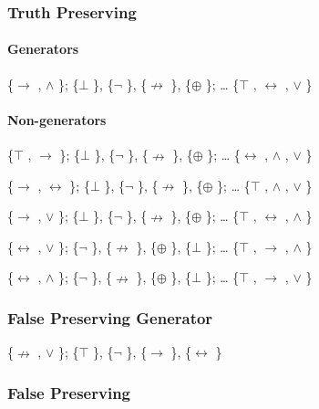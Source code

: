\hypertarget{truth-preserving}{%
\subsubsection{Truth Preserving}\label{truth-preserving}}

\hypertarget{generators}{%
\paragraph{Generators}\label{generators}}

\{$\to$ , $\land$ \}; \{$\bot$ \}, \{$\neg$ \}, \{$\nrightarrow$ \}, \{$\oplus$ \}; \ldots{} \{$\top$ , $\leftrightarrow$ , $\lor$ \}

\hypertarget{non-generators}{%
\paragraph{Non-generators}\label{non-generators}}

\{$\top$ , $\to$ \}; \{$\bot$ \}, \{$\neg$ \}, \{$\nrightarrow$ \}, \{$\oplus$ \}; \ldots{} \{$\leftrightarrow$ , $\land$ , $\lor$ \}

\{$\to$ , $\leftrightarrow$ \}; \{$\bot$ \}, \{$\neg$ \}, \{$\nrightarrow$ \}, \{$\oplus$ \}; \ldots{} \{$\top$ , $\land$ , $\lor$ \}

\{$\to$ , $\lor$ \}; \{$\bot$ \}, \{$\neg$ \}, \{$\nrightarrow$ \}, \{$\oplus$ \}; \ldots{} \{$\top$ , $\leftrightarrow$ , $\land$ \}

\{$\leftrightarrow$ , $\lor$ \}; \{$\neg$ \}, \{$\nrightarrow$ \}, \{$\oplus$ \}, \{$\bot$ \}; \ldots{} \{$\top$ , $\to$ , $\land$ \}

\{$\leftrightarrow$ , $\land$ \}; \{$\neg$ \}, \{$\nrightarrow$ \}, \{$\oplus$ \}, \{$\bot$ \}; \ldots{} \{$\top$ , $\to$ , $\lor$ \}

\hypertarget{false-preserving-generator}{%
\subsubsection{False Preserving
Generator}\label{false-preserving-generator}}

\{$\nrightarrow$ , $\lor$ \}; \{$\top$ \}, \{$\neg$ \}, \{$\to$ \}, \{$\leftrightarrow$ \}

\hypertarget{false-preserving}{%
\subsubsection{False Preserving}\label{false-preserving}}

